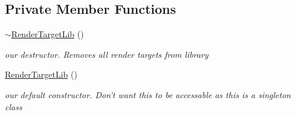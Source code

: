 \subsection*{Private Member Functions}
\begin{DoxyCompactItemize}
\item 
\hypertarget{class_render_target_lib_a0ae1e327dc608b42223cf41de7363110}{\hyperlink{class_render_target_lib_a0ae1e327dc608b42223cf41de7363110}{$\sim$\-Render\-Target\-Lib} ()}\label{class_render_target_lib_a0ae1e327dc608b42223cf41de7363110}

\begin{DoxyCompactList}\small\item\em our destructor. Removes all render targets from library \end{DoxyCompactList}\item 
\hypertarget{class_render_target_lib_aca1daab0d875c1e27e95d290851b1870}{\hyperlink{class_render_target_lib_aca1daab0d875c1e27e95d290851b1870}{Render\-Target\-Lib} ()}\label{class_render_target_lib_aca1daab0d875c1e27e95d290851b1870}

\begin{DoxyCompactList}\small\item\em our default constructor. Don't want this to be accessable as this is a singleton class \end{DoxyCompactList}\end{DoxyCompactItemize}
